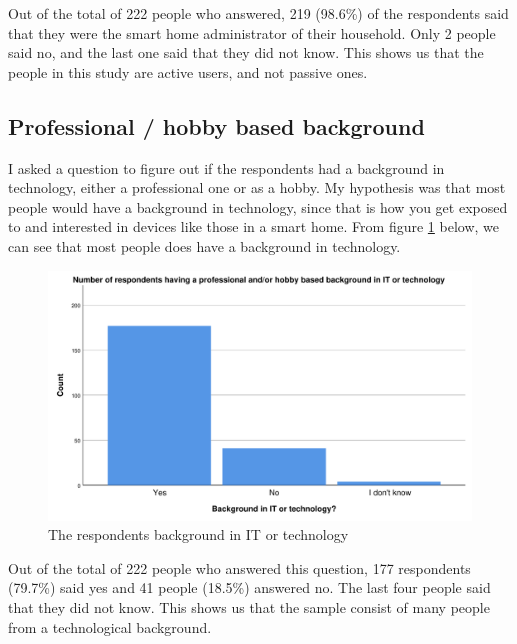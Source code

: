 Out of the total of 222 people who answered, 219 (98.6\%) of the respondents said that they were the smart home administrator of their household. Only 2 people said no, and the last one said that they did not know. This shows us that the people in this study are active users, and not passive ones. 

\subsection{Professional / hobby based background}
I asked a question to figure out if the respondents had a background in technology, either a professional one or as a hobby. My hypothesis was that most people would have a background in technology, since that is how you get exposed to and interested in devices like those in a smart home. From figure \ref{fig:background} below, we can see that most people does have a background in technology. 
\begin{figure}[!h]
    \centering
    \includegraphics[scale=0.55]{figures/diagrams/background.pdf}
    \caption{The respondents background in IT or technology}
    \label{fig:background}
\end{figure}
Out of the total of 222 people who answered this question, 177 respondents (79.7\%) said yes and 41 people (18.5\%) answered no. The last four people said that they did not know. This shows us that the sample consist of many people from a technological background. 

